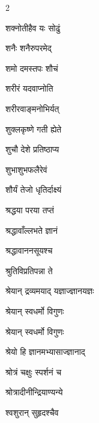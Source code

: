 \begin{multicols}{2}
\begin{indexlist}
\item शक्नोतीहैव यः सोढुं \dotfill {}
\item शनैः शनैरुपरमेद् \dotfill {}
\item शमो दमस्तपः शौचं \dotfill {}
\item शरीरं यदवाप्नोति \dotfill {}
\item शरीरवाङ्मनोभिर्यत् \dotfill {}
\item शुक्लकृष्णे गती ह्येते \dotfill {}
\item शुचौ देशे प्रतिष्ठाप्य \dotfill {}
\item शुभाशुभफलैरेवं \dotfill {}
\item शौर्यं तेजो धृतिर्दाक्ष्यं \dotfill {}
\item श्रद्धया परया तप्तं \dotfill {}
\item श्रद्धावाँल्लभते ज्ञानं \dotfill {}
\item श्रद्धावाननसूयश्च \dotfill {}
\item श्रुतिविप्रतिपन्ना ते \dotfill {}
\item श्रेयान् द्रव्यमयाद् यज्ञाज्ज्ञानयज्ञः \dotfill {}
\item श्रेयान् स्वधर्मो विगुणः \dotfill {}
\item श्रेयान् स्वधर्मो विगुणः \dotfill {}
\item श्रेयो हि ज्ञानमभ्यासाज्ज्ञानाद्‌ \dotfill {}
\item श्रोत्रं चक्षुः स्पर्शनं च \dotfill {}
\item श्रोत्रादीनीन्द्रियाण्यन्ये \dotfill {}
\item श्वशुरान् सुहृदश्चैव \dotfill {}
\end{indexlist}


\end{multicols}
